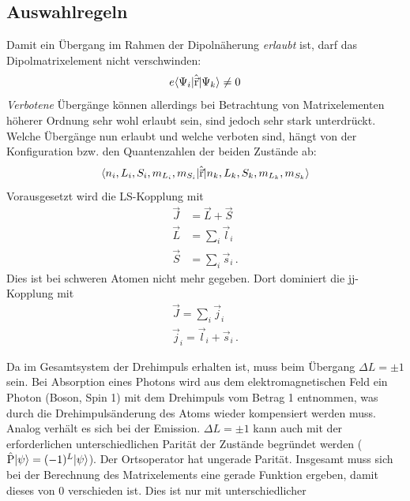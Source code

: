 \subsection{Auswahlregeln}\label{subsec:auswahlregeln}
Damit ein Übergang im Rahmen der Dipolnäherung \textit{erlaubt} ist, darf das
Dipolmatrixelement nicht verschwinden:
\begin{equation}\label{eq:dipolmatrixelement}
	e\langle{\Psi_i}|\hat{\vec{\mathrm{r}}}|{\Psi_k}\rangle\neq0
\end{equation}
\textit{Verbotene} Übergänge können allerdings bei Betrachtung von
Matrixelementen höherer Ordnung sehr wohl erlaubt sein, sind jedoch sehr stark
unterdrückt. Welche Übergänge nun erlaubt und welche verboten sind, hängt von
der Konfiguration bzw. den Quantenzahlen der beiden Zustände ab:
\begin{equation}\label{eq:dipolmatrixelement_quantenzahlen}
	\langle{n_i,L_i,S_i,m_{L_i}, m_{S_i}}|\hat{\vec{\mathrm{r}}}|{n_k,L_k,S_k,m_{L_k}, m_{S_k}}\rangle
\end{equation}
Vorausgesetzt wird die LS-Kopplung mit
\begin{equation}\label{eq:LS-Kopplung}
	\begin{split}
		\vec{J}&=\vec{L}+\vec{S}\\
		\vec{L}&=\sum\limits_i\vec{l}_i\\
		\vec{S}&=\sum\limits_i\vec{s}_i\,.
	\end{split}
\end{equation}
Dies ist bei schweren Atomen nicht mehr gegeben. Dort dominiert die
jj-Kopplung mit
\begin{equation}\label{eq:jj-Kopplung}
	\begin{split}
		\vec{J}=\sum\limits_i\vec{j}_i\\
		\vec{j}_i=\vec{l}_i+\vec{s}_i\,.
	\end{split}
\end{equation}
\par
Da im Gesamtsystem der Drehimpuls erhalten ist, muss beim Übergang $\Delta L
=\pm1$ sein.
Bei Absorption eines Photons wird aus dem elektromagnetischen Feld ein Photon (Boson, Spin 1) mit dem Drehimpuls vom
Betrag 1 entnommen, was durch die Drehimpulsänderung des Atoms wieder
kompensiert werden muss. Analog verhält es sich bei der Emission. $\Delta L =\pm1$ kann auch mit
der erforderlichen unterschiedlichen Parität der Zustände begründet werden
($\hat{\mathrm{P}}|{\psi}\rangle=(-1)^L|{\psi}\rangle$). Der Ortsoperator hat ungerade Parität.
Insgesamt muss sich bei der Berechnung des Matrixelements eine gerade Funktion
ergeben, damit dieses von 0 verschieden ist. Dies ist nur mit unterschiedlicher
